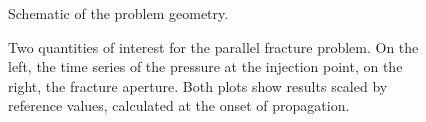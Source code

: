 \begin{figure}[ht]
  \centering
  \caption{Schematic of the problem geometry.}
  \label{fig:parallel_schematic}
\end{figure}


\begin{figure}[h]
  \noindent
  \hspace{0.5cm}
  
  \caption{Two quantities of interest for the parallel fracture problem. On the left, the time series of the pressure at the injection point, on the right, the fracture aperture. Both plots show results scaled by reference values, calculated at the onset of propagation.}  
  \label{fig:parallel_fracs_charts}
\end{figure}


